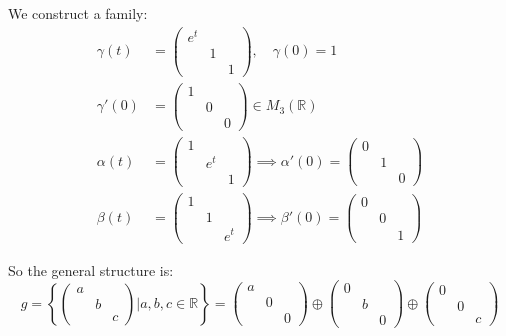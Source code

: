\documentclass[12pt]{article}
\newcommand{\R}{\mathbb{R}}
\begin{document}
    We construct a family: 
    \begin{align*}
        \gamma(t) &= \begin{pmatrix}
            e^t\\ 
            & 1\\ 
            & & 1
        \end{pmatrix}, \quad \gamma(0) = 1\\ 
        \gamma'(0) &= \begin{pmatrix}
            1\\ 
            & 0\\ 
            & & 0
        \end{pmatrix} \in M_3(\R)\\ 
        \alpha(t) &= \begin{pmatrix}
            1\\ 
            & e^t\\ 
            & & 1
        \end{pmatrix} \implies \alpha'(0) = \begin{pmatrix}
            0\\ 
            & 1\\ 
            & & 0
        \end{pmatrix}\\ 
        \beta(t) &= \begin{pmatrix}
            1\\ 
            & 1\\ 
            & & e^t
        \end{pmatrix} \implies \beta'(0) = \begin{pmatrix}
            0\\ 
            & 0\\ 
            & & 1
        \end{pmatrix}
    \end{align*}
   
    So the general structure is:
    \[g = \left\{\begin{pmatrix}
        a\\ 
        & b\\
        & & c
    \end{pmatrix} \bigg\vert a, b, c \in \R\right\} = \begin{pmatrix}
        a\\ 
        & 0\\ 
        & & 0
    \end{pmatrix} \oplus \begin{pmatrix}
        0\\ 
        & b\\ 
        & & 0
    \end{pmatrix} \oplus \begin{pmatrix}
        0\\ 
        & 0\\ 
        & & c
    \end{pmatrix}\] 
\end{document}
